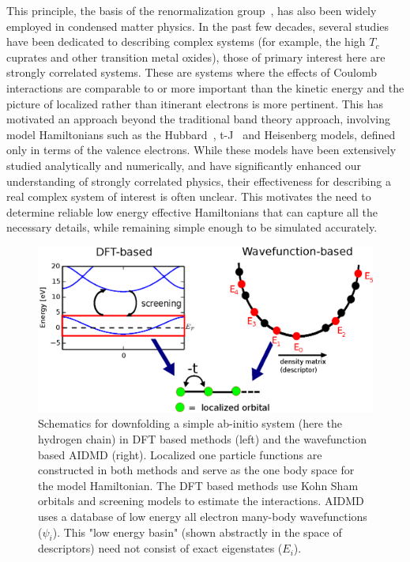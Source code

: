 This principle, the basis of the renormalization group~\cite{Wilson}, has also been widely employed in condensed matter physics. 
In the past few decades, several studies have been dedicated to describing complex systems (for example, the high $T_c$ cuprates and other transition metal oxides), those of primary interest here are strongly correlated systems. 
These are systems where the effects of Coulomb interactions are comparable to or more important than the kinetic energy and the picture of localized rather than itinerant electrons is more pertinent. This has motivated an approach beyond the traditional band theory approach, involving model Hamiltonians such as the Hubbard~\cite{Hubbard}, t-J~\cite{tJSpalek} and Heisenberg models, defined only in terms of the valence electrons. 
While these models have been extensively studied analytically and numerically, and have significantly enhanced our understanding of strongly correlated physics, their effectiveness for describing a real complex system of interest is often unclear. 
This motivates the need to determine reliable low energy effective Hamiltonians that can capture all the necessary details, while remaining simple enough to be simulated accurately.  

\begin{figure}
\centering
\includegraphics[width=1\linewidth]{./Figures/figure1.eps}
\caption{Schematics for downfolding a simple ab-initio system (here the hydrogen chain) in DFT based methods (left) and the wavefunction based AIDMD (right). 
Localized one particle functions are constructed in both methods and serve as the one body space for the model Hamiltonian. 
The DFT based methods use Kohn Sham orbitals and screening models to estimate the interactions. 
AIDMD uses a database of low energy all electron many-body wavefunctions ($\psi_i$). 
This "low energy basin" (shown abstractly in the space of descriptors) need not consist of exact eigenstates ($E_i$).}
\label{fig:lowenergybasin_schematic}
\end{figure}	


